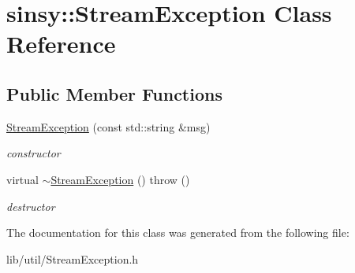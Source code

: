 \hypertarget{classsinsy_1_1StreamException}{\section{sinsy\-:\-:\-Stream\-Exception \-Class \-Reference}
\label{classsinsy_1_1StreamException}
}
\subsection*{\-Public \-Member \-Functions}
\begin{DoxyCompactItemize}
\item 
\hypertarget{classsinsy_1_1StreamException_a397caf8a6766811aa67bdfd7856b1c7d}{\hyperlink{classsinsy_1_1StreamException_a397caf8a6766811aa67bdfd7856b1c7d}{\-Stream\-Exception} (const std\-::string \&msg)}\label{classsinsy_1_1StreamException_a397caf8a6766811aa67bdfd7856b1c7d}

\begin{DoxyCompactList}\small\item\em constructor \end{DoxyCompactList}\item 
\hypertarget{classsinsy_1_1StreamException_a60ede7f62c743c7e9e8dc6e92813f227}{virtual \hyperlink{classsinsy_1_1StreamException_a60ede7f62c743c7e9e8dc6e92813f227}{$\sim$\-Stream\-Exception} ()  throw ()}\label{classsinsy_1_1StreamException_a60ede7f62c743c7e9e8dc6e92813f227}

\begin{DoxyCompactList}\small\item\em destructor \end{DoxyCompactList}\end{DoxyCompactItemize}


\-The documentation for this class was generated from the following file\-:\begin{DoxyCompactItemize}
\item 
lib/util/\-Stream\-Exception.\-h\end{DoxyCompactItemize}
